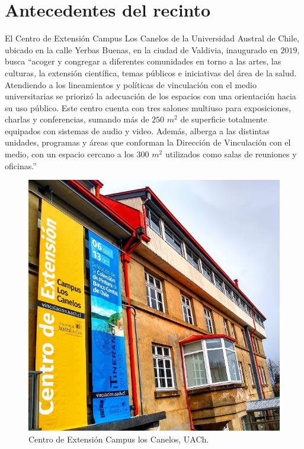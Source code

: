 \section{Antecedentes del recinto}
\noindent 
El Centro de Extensión Campus Los Canelos de la Universidad Austral de Chile, ubicado en la calle Yerbas Buenas, en la ciudad de Valdivia, inaugurado en $2019$, busca ``acoger y congregar a diferentes comunidades en torno a las artes, las culturas, la extensión científica, temas públicos e iniciativas del área de la salud. Atendiendo a los lineamientos y políticas de vinculación con el medio universitarias se priorizó la adecuación de los espacios con una orientación hacia su uso público. Este centro cuenta con tres salones multiuso para exposiciones, charlas y conferencias, sumando más de $250$ $m^2$ de superficie totalmente equipados con sistemas de audio y video. Además, alberga a las distintas unidades, programas y áreas que conforman la Dirección de Vinculación con el medio, con un espacio cercano a los $300$ $m^2$ utilizados como salas de reuniones y oficinas.'' \cite{loscanelos}

\begin{figure}[H]
    \centering
\includegraphics[scale=0.45]{Imagenes/centroextensionuach.jpg}
    \caption{Centro de Extensión Campus los Canelos, UACh.}
    \label{fig:los-canelos}
\end{figure}

